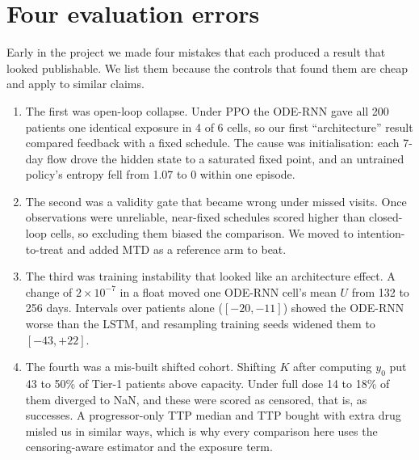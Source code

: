 \documentclass[10pt]{article}
\begin{document}
\section{Four evaluation errors}\label{sec:pitfalls}
Early in the project we made four mistakes that each produced a result that
looked publishable. We list them because the controls that found them are cheap
and apply to similar claims.
\begin{enumerate}
\item The first was open-loop collapse. Under PPO the ODE-RNN gave all 200
patients one identical exposure in 4 of 6 cells, so our first ``architecture''
result compared feedback with a fixed schedule. The cause was initialisation:
each 7-day flow drove the hidden state to a saturated fixed point, and an
untrained policy's entropy fell from 1.07 to 0 within one episode.
\item The second was a validity gate that became wrong under missed visits. Once
observations were unreliable, near-fixed schedules scored higher than
closed-loop cells, so excluding them biased the comparison. We moved to
intention-to-treat and added MTD as a reference arm to beat. %
\item The third was training instability that looked like an architecture effect.
A change of $2\times10^{-7}$ in a float moved one ODE-RNN cell's mean $U$ from
132 to 256 days. Intervals over patients alone ($[-20,-11]$) showed the ODE-RNN
worse than the LSTM, and resampling training seeds widened them to $[-43,+22]$.
\item The fourth was a mis-built shifted cohort. Shifting $K$ after computing
$y_0$ put 43 to 50\% of Tier-1 patients above capacity. Under full dose 14 to
18\% of them diverged to NaN, and these were scored as censored, that is, as
successes. A progressor-only TTP median and TTP bought with extra drug misled us
in similar ways, which is why every comparison here uses the censoring-aware
estimator and the exposure term. %
\end{enumerate}
\end{document}
